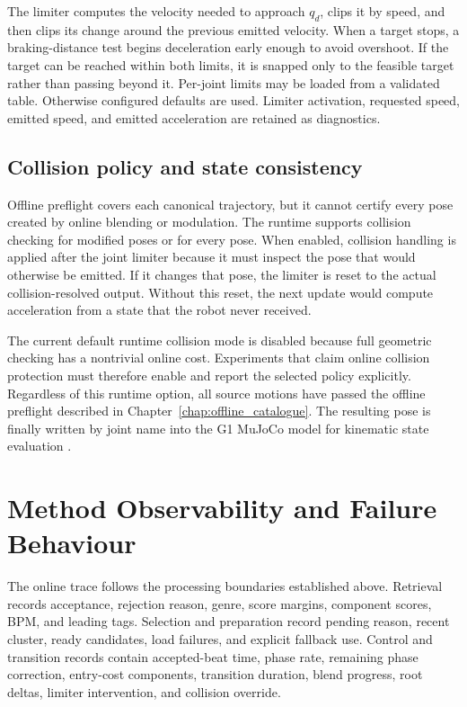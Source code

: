 The limiter computes the velocity needed to approach $q_d$, clips it by speed,
and then clips its change around the previous emitted velocity. When a target
stops, a braking-distance test begins deceleration early enough to avoid
overshoot. If the target can be reached within both limits, it is snapped only
to the feasible target rather than passing beyond it. Per-joint limits may be
loaded from a validated table. Otherwise configured defaults are
used. Limiter activation, requested speed, emitted speed, and emitted
acceleration are retained as diagnostics.

\subsection{Collision policy and state consistency}
\label{subsec:ch5_runtime_collision}

Offline preflight covers each canonical trajectory, but it cannot certify every
pose created by online blending or modulation. The runtime supports collision
checking for modified poses or for every pose. When enabled, collision handling
is applied after the joint limiter because it must inspect the pose that would
otherwise be emitted. If it changes that pose, the limiter is reset to the
actual collision-resolved output. Without this reset, the next update would
compute acceleration from a state that the robot never received.

The current default runtime collision mode is disabled because full geometric
checking has a nontrivial online cost. Experiments that claim online collision
protection must therefore enable and report the selected policy explicitly.
Regardless of this runtime option, all source motions have passed the offline
preflight described in Chapter~\ref{chap:offline_catalogue}. The resulting pose
is finally written by joint name into the G1 MuJoCo model for kinematic state
evaluation \cite{todorov2012mujoco}.

\section{Method Observability and Failure Behaviour}
\label{sec:ch5_observability}

The online trace follows the processing boundaries established above.
Retrieval records acceptance, rejection reason, genre, score margins, component
scores, BPM, and leading tags. Selection and preparation record pending reason,
recent cluster, ready candidates, load failures, and explicit fallback use.
Control and transition records contain accepted-beat time, phase rate, remaining
phase correction, entry-cost components, transition duration, blend progress,
root deltas, limiter intervention, and collision override.

